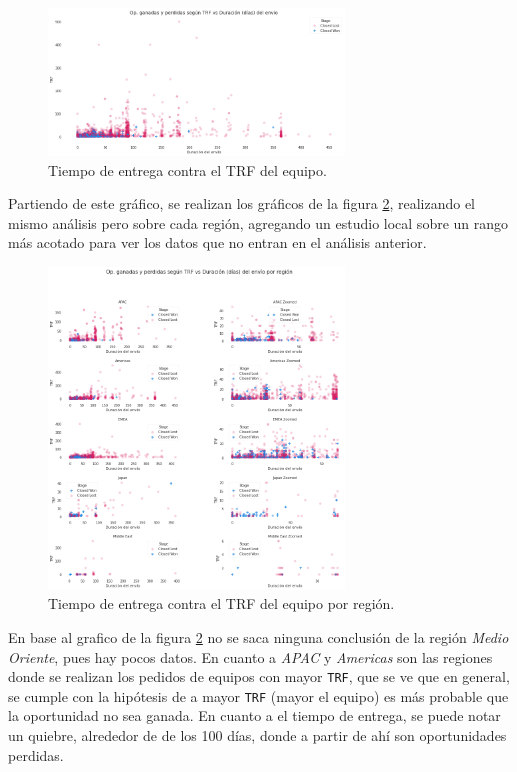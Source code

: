\documentclass[titlepage,a4paper]{article}
\begin{document}
\begin{figure}[H]
\centering
\includegraphics[width=0.7\textwidth]{images/scatter_dur_envio_trf.png}
\cprotect\caption{\label{fig:scatter_dur_envio_trf} Tiempo de entrega contra el TRF del equipo. }
\end{figure}

Partiendo de este gráfico, se realizan los gráficos de la figura \ref{fig:scatter_dur_envio_trf_region}, realizando el mismo análisis pero sobre cada región, agregando un estudio local sobre un rango más acotado para ver los datos que no entran en el análisis anterior.
\begin{figure}[H]
\centering
\includegraphics[width=0.7\textwidth]{images/scatter_dur_envio_trf_region.png}
\cprotect\caption{\label{fig:scatter_dur_envio_trf_region} Tiempo de entrega contra el TRF del equipo por región. }
\end{figure}

En base al grafico de la figura \ref{fig:scatter_dur_envio_trf_region} no se saca ninguna conclusión de la región \textit{Medio Oriente}, pues hay pocos datos. En cuanto a \textit{APAC} y \textit{Americas} son las regiones donde se realizan los pedidos de equipos con mayor \verb|TRF|, que se ve que en general, se cumple con la hipótesis de a mayor \verb|TRF| (mayor el equipo) es más probable que la oportunidad no sea ganada. En cuanto a el tiempo de entrega, se puede notar un quiebre, alrededor de de los 100 días, donde a partir de ahí son oportunidades perdidas.
\end{document}
